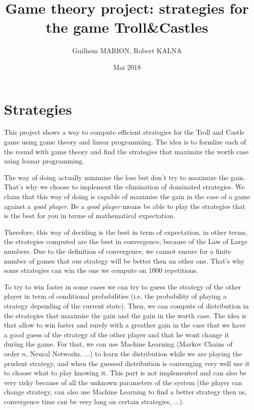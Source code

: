 \documentclass{article}%
\begin{document}
%
\author{Guilhem MARION, Robert KALNA}
\title{Game theory project: strategies for the game Troll\&Castles}
\date{Mai 2018}
\maketitle
\normalsize%
\section{Strategies}

This project shows a way to compute efficient strategies for the Troll and Castle game using game theory and linear programming. The idea is to formlize each of the round with game theory and find the strategies that maximize the worth case using leanar programming. 

The way of doing actually minimize the loss but don't try to maximize the gain. That's why we choose to implement the elimination of dominated strategies. We claim that this way of doing is capable of maximise the gain in the case of a game against a \textit{good player}. Be a \textit{good player} means be able to play the strategies that is the best for you in terme of mathematical expectation. 

Therefore, this way of deciding is the best in term of expectation, in other terms, the strategies computed are the best in convergence, because of the Law of Large numbers. Due to the definition of convergence, we cannot ensure for a finite number of games that our strategy will be better then an other one. That's why some strategies can win the one we compute on 1000 repetitions. 

To try to win faster in some cases we can try to guess the strategy of the other player in term of conditional probabilities (i.e. the probability of playing a strategy depending of the current state). Then, we can compute of distribution in the strategies that maximise the gain and the gain in the worth case. The idea is that allow to win faster and surely with a greather gain in the case that we have a good guess of the strategy of the other player and that he wont change it during the game. 
For that, we can use Machine Learning (Markov Chains of order $n$, Neural Networks, ...) to learn the distribution while we are playing the prudent strategy, and when the guessed distribution is convenging very well use it to choose what to play knowing it. This part is not implemented and can also be very risky because of all the unknown parameters of the system (the player can change strategy, can also use Machine Learning to find a better strategy then us, convergence time can be very long on certain strategies, ...). 
\end{document}
